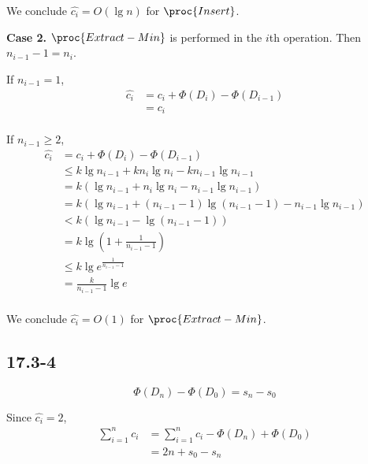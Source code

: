 We conclude $\hat{c_i} = O(\lg n)$ for $\proc{Insert}$.

\textbf{Case 2.}
$\proc{Extract-Min}$ is performed in the $i$th operation.
Then $n_{i-1} - 1 = n_i$.

If $n_{i-1} = 1$,
\begin{equation*}
\begin{split}
    \hat{c_i} & = c_i + \Phi(D_i) - \Phi(D_{i - 1}) \\
    & = c_i \\
\end{split}
\end{equation*}

If $n_{i-1} \geq 2$,
\begin{equation*}
\begin{split}
    \hat{c_i} & = c_i + \Phi(D_i) - \Phi(D_{i - 1}) \\
    & \leq k \lg n_{i-1} + k n_i \lg n_i - k n_{i-1} \lg n_{i-1} \\
    & = k (\lg n_{i-1} + n_i \lg n_i - n_{i-1} \lg n_{i-1}) \\
    & = k (\lg n_{i-1} + (n_{i-1} - 1) \lg (n_{i-1} - 1) - n_{i-1} \lg n_{i-1}) \\
    & < k (\lg n_{i-1} - \lg (n_{i-1} - 1)) \\
    & = k \lg (1 + \frac{1}{n_{i-1} - 1}) \\
    & \leq k \lg e^{\frac{1}{n_{i-1} - 1}} \\
    & = \frac{k}{n_{i-1} - 1} \lg e \\
\end{split}
\end{equation*}

We conclude $\hat{c_i} = O(1)$ for $\proc{Extract-Min}$.

\subsection*{17.3-4}

\begin{equation*}
    \Phi(D_{n}) - \Phi(D_{0}) = s_n - s_0
\end{equation*}

Since $\hat{c_i} = 2$,
\begin{equation*}
\begin{split}
    \sum\limits_{i = 1}^n c_i
    & = \sum\limits_{i = 1}^n \hat{c_i}
    - \Phi(D_{n}) + \Phi(D_{0}) \\
    & = 2n + s_0 - s_n
\end{split}
\end{equation*}

